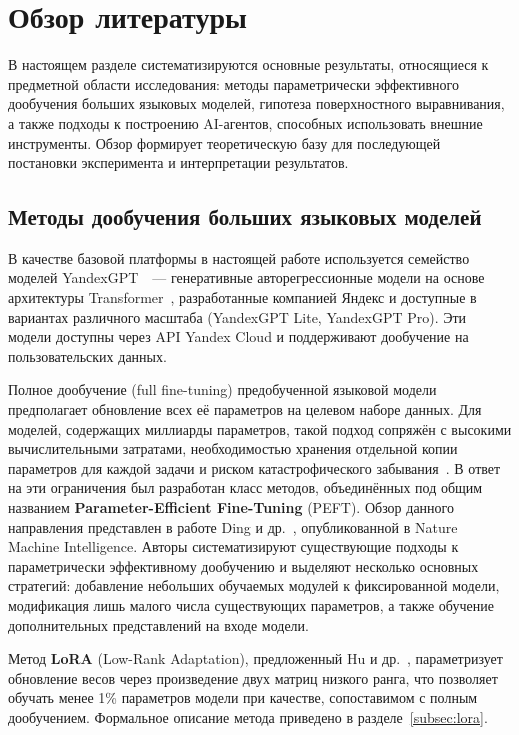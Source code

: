
\section{Обзор литературы} \label{sec:related}

В настоящем разделе систематизируются основные результаты, относящиеся к предметной области исследования: методы параметрически эффективного дообучения больших языковых моделей, гипотеза поверхностного выравнивания, а также подходы к построению AI-агентов, способных использовать внешние инструменты. Обзор формирует теоретическую базу для последующей постановки эксперимента и интерпретации результатов.

\subsection{Методы дообучения больших языковых моделей}

В качестве базовой платформы в настоящей работе используется семейство моделей YandexGPT~\cite{yandexgpt2024docs}~--- генеративные авторегрессионные модели на основе архитектуры Transformer~\cite{vaswani2017attention, radford2019language}, разработанные компанией Яндекс и доступные в вариантах различного масштаба (YandexGPT Lite, YandexGPT Pro). Эти модели доступны через API Yandex Cloud и поддерживают дообучение на пользовательских данных.

Полное дообучение (full fine-tuning) предобученной языковой модели предполагает обновление всех её параметров на целевом наборе данных. Для моделей, содержащих миллиарды параметров, такой подход сопряжён с высокими вычислительными затратами, необходимостью хранения отдельной копии параметров для каждой задачи и риском катастрофического забывания~\cite{kirkpatrick2017overcoming}. В ответ на эти ограничения был разработан класс методов, объединённых под общим названием \textbf{Parameter-Efficient Fine-Tuning} (PEFT). Обзор данного направления представлен в работе Ding и др.~\cite{ding2023parameter}, опубликованной в Nature Machine Intelligence. Авторы систематизируют существующие подходы к параметрически эффективному дообучению и выделяют несколько основных стратегий: добавление небольших обучаемых модулей к фиксированной модели, модификация лишь малого числа существующих параметров, а также обучение дополнительных представлений на входе модели.

Метод \textbf{LoRA} (Low-Rank Adaptation), предложенный Hu и др.~\cite{hu2022lora}, параметризует обновление весов через произведение двух матриц низкого ранга, что позволяет обучать менее 1\% параметров модели при качестве, сопоставимом с полным дообучением. Формальное описание метода приведено в разделе~\ref{subsec:lora}.


